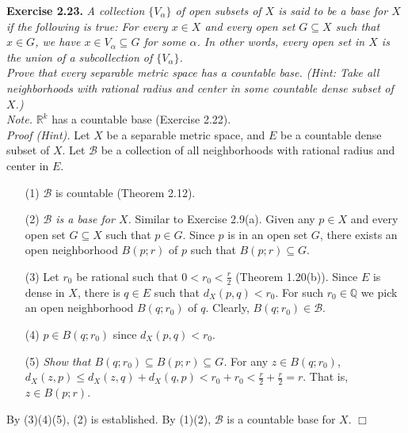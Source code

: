 \documentclass{article}
\begin{document}



\textbf{Exercise 2.23.}
\emph{A collection $\{V_\alpha\}$ of open subsets of $X$ is
said to be a base for $X$ if the following is true:
For every $x \in X$ and every open set $G \subseteq X$ such that $x \in G$,
we have $x \in V_\alpha \subseteq G$ for some $\alpha$.
In other words, every open set in $X$ is the union of a subcollection of $\{V_\alpha\}$.} \\

\emph{Prove that every separable metric space has a countable base.
(Hint: Take all neighborhoods with rational radius and center
in some countable dense subset of $X$.)} \\

\emph{Note.}
$\mathbb{R}^k$ has a countable base (Exercise 2.22). \\

\emph{Proof (Hint).}
Let $X$ be a separable metric space,
and $E$ be a countable dense subset of $X$.
Let $\mathscr{B}$ be a collection of
all neighborhoods with rational radius and center in $E$.
\begin{enumerate}
\item[(1)]
$\mathscr{B}$ is countable (Theorem 2.12).
\item[(2)]
\emph{$\mathscr{B}$ is a base for $X$.}
Similar to Exercise 2.9(a).
Given any $p \in X$ and every open set $G \subseteq X$ such that
$p \in G$.
Since $p$ is in an open set $G$,
there exists an open neighborhood $B(p;r)$ of $p$ such that $B(p;r) \subseteq G$.
\item[(3)]
Let $r_0$ be rational such that $0 < r_0 < \frac{r}{2}$ (Theorem 1.20(b)).
Since $E$ is dense in $X$, there is $q \in E$ such that $d_X(p,q) < r_0$.
For such $r_0 \in \mathbb{Q}$ we pick an open neighborhood $B(q;r_0)$ of $q$.
Clearly, $B(q;r_0) \in \mathscr{B}$.
\item[(4)]
$p \in B(q;r_0)$ since $d_X(p,q) < r_0$.
\item[(5)]
\emph{Show that $B(q;r_0) \subseteq B(p;r) \subseteq G$.}
For any $z \in B(q;r_0)$, $d_X(z,p) \leq d_X(z,q)+ d_X(q,p) < r_0 + r_0
< \frac{r}{2} + \frac{r}{2} = r$.
That is, $z \in B(p;r)$.
\end{enumerate}
By (3)(4)(5), (2) is established.
By (1)(2), $\mathscr{B}$ is a countable base for $X$.
$\Box$ \\
\end{document}
